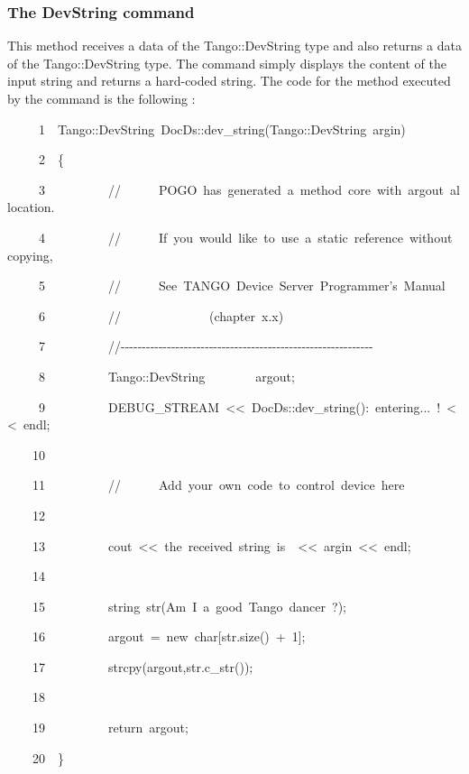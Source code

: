 \subsubsection{The DevString command}

This method receives a data of the Tango::DevString
type and also returns a data of the Tango::DevString type. The command
simply displays the content of the input string and returns a hard-coded
string. The code for the method executed by the command is the following
:


\begin{lyxcode}
~~~~~1~~Tango::DevString~DocDs::dev\_string(Tango::DevString~argin)

~~~~~2~~\{

~~~~~3~~~~~~~~~~//~~~~~~POGO~has~generated~a~method~core~with~argout~allocation.

~~~~~4~~~~~~~~~~//~~~~~~If~you~would~like~to~use~a~static~reference~without~copying,

~~~~~5~~~~~~~~~~//~~~~~~See~\textquotedbl{}TANGO~Device~Server~Programmer's~Manual\textquotedbl{}

~~~~~6~~~~~~~~~~//~~~~~~~~~~~~~~(chapter~x.x)

~~~~~7~~~~~~~~~~//-{}-{}-{}-{}-{}-{}-{}-{}-{}-{}-{}-{}-{}-{}-{}-{}-{}-{}-{}-{}-{}-{}-{}-{}-{}-{}-{}-{}-{}-{}-{}-{}-{}-{}-{}-{}-{}-{}-{}-{}-{}-{}-{}-{}-{}-{}-{}-{}-{}-{}-{}-{}-{}-{}-{}-{}-{}-{}-{}-

~~~~~8~~~~~~~~~~Tango::DevString~~~~~~~~argout;

~~~~~9~~~~~~~~~~DEBUG\_STREAM~<\textcompwordmark{}<~\textquotedbl{}DocDs::dev\_string():~entering...~!\textquotedbl{}~<\textcompwordmark{}<~endl;

~~~~10~~

~~~~11~~~~~~~~~~//~~~~~~Add~your~own~code~to~control~device~here

~~~~12~~

~~~~13~~~~~~~~~~cout~<\textcompwordmark{}<~\textquotedbl{}the~received~string~is~\textquotedbl{}~<\textcompwordmark{}<~argin~<\textcompwordmark{}<~endl;

~~~~14~~~~~~~~~~

~~~~15~~~~~~~~~~string~str(\textquotedbl{}Am~I~a~good~Tango~dancer~?\textquotedbl{});

~~~~16~~~~~~~~~~argout~=~new~char{[}str.size()~+~1{]};

~~~~17~~~~~~~~~~strcpy(argout,str.c\_str());

~~~~18~~~~~~~~~~

~~~~19~~~~~~~~~~return~argout;

~~~~20~~\}
\end{lyxcode}


